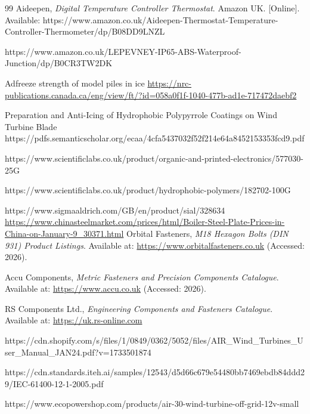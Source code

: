 \documentclass[11pt,a4paper]{article}
\begin{document}
\begin{thebibliography}{99}
Aideepen, 
\textit{Digital Temperature Controller Thermostat}. 
Amazon UK. [Online]. Available: https://www.amazon.co.uk/Aideepen-Thermostat-Temperature-Controller-Thermometer/dp/B08DD9LNZL



https://www.amazon.co.uk/LEPEVNEY-IP65-ABS-Waterproof-Junction/dp/B0CR3TW2DK







Adfreeze strength of model piles in ice
\url{https://nrc-publications.canada.ca/eng/view/ft/?id=058a0f1f-1040-477b-ad1e-717472daebf2}

Preparation and Anti-Icing of Hydrophobic Polypyrrole Coatings on Wind Turbine Blade 
https://pdfs.semanticscholar.org/ecaa/4cfa5437032f52f214e64a8452153353fcd9.pdf

https://www.scientificlabs.co.uk/product/organic-and-printed-electronics/577030-25G

https://www.scientificlabs.co.uk/product/hydrophobic-polymers/182702-100G

https://www.sigmaaldrich.com/GB/en/product/sial/328634
\url{https://www.chinasteelmarket.com/prices/html/Boiler-Steel-Plate-Prices-in-China-on-January-9_30371.html}
Orbital Fasteners, 
\textit{M18 Hexagon Bolts (DIN 931) Product Listings}. 
Available at: \url{https://www.orbitalfasteners.co.uk} 
(Accessed: 2026).

Accu Components, 
\textit{Metric Fasteners and Precision Components Catalogue}. 
Available at: \url{https://www.accu.co.uk} 
(Accessed: 2026).

RS Components Ltd., 
\textit{Engineering Components and Fasteners Catalogue}. 
Available at: \url{https://uk.rs-online.com} 

https://cdn.shopify.com/s/files/1/0849/0362/5052/files/AIR_Wind_Turbines_User_Manual_JAN24.pdf?v=1733501874

https://cdn.standards.iteh.ai/samples/12543/d5d66c679e54480bb7469ebdb84ddd29/IEC-61400-12-1-2005.pdf

https://www.ecopowershop.com/products/air-30-wind-turbine-off-grid-12v-small

\end{thebibliography}
\end{document}
